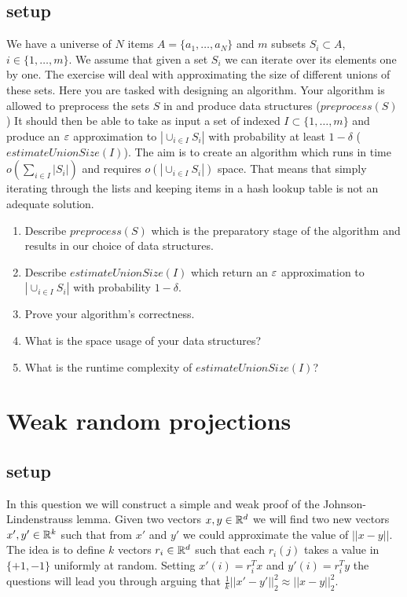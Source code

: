 \documentclass{article}
\begin{document}
\subsection*{setup}
We have a universe of $N$ items $A = \{a_1,\ldots, a_N\}$
and $m$ subsets $S_i \subset A$, $i \in \{1,\ldots,m\}$.
We assume that given a set $S_i$ we can iterate over its elements one by one.
The exercise will deal with approximating the size of different unions of these sets.  
Here you are tasked with designing an algorithm. 
Your algorithm is allowed to preprocess the sets $S$ in and produce data structures ($preprocess(S)$)
It should then be able to take as input a set of indexed $I \subset \{1,\ldots,m\}$ and produce
an $\varepsilon$ approximation to $|\cup_{i \in I}S_i|$ with probability at least $1-\delta$ ($estimateUnionSize(I)$).
The aim is to create an algorithm which runs in time $o(\sum_{i \in I}|S_i|)$ and requires $o(|\cup_{i \in I}S_i|)$ space. 
That means that simply iterating through the lists and keeping items in a hash lookup table is not an adequate solution. 

\begin{enumerate}
\item Describe $preprocess(S)$ which is the preparatory stage of the algorithm and results in our choice of data structures.
\item Describe $estimateUnionSize(I)$ which return an $\varepsilon$ approximation to $|\cup_{i \in I}S_i|$ with probability $1-\delta$.
\item Prove your algorithm's correctness.
\item What is the space usage of your data structures?
\item What is the runtime complexity of $estimateUnionSize(I)$?
\end{enumerate}


\pagebreak


\section{Weak random projections}
\subsection*{setup}
In this question we will construct a simple and weak proof of the Johnson-Lindenstrauss lemma. 
Given two vectors $x,y \in{\mathbb{R}}^{d}$ we will find two new vectors $x',y'\in {\mathbb{R}}^{k}$ such that from $x'$ and
$y'$ we could approximate the value of $||x-y||$. The idea is to
define $k$ vectors $r_i \in {\mathbb{R}}^{d}$ such that each $r_i(j)$ takes a
value in $\{+1,-1\}$ uniformly at random. Setting $x'(i) =
r_{i}^{T}x$ and $y'(i) = r_{i}^{T}y$ the questions will lead you through arguing that
$\frac{1}{k}||x' -y'||_{2}^{2} \approx ||x-y||_{2}^{2}$.
\end{document}
